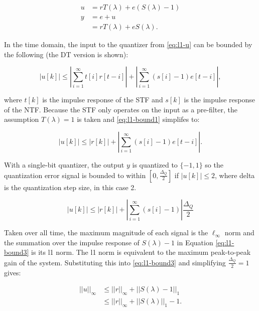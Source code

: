\begin{align}
	u &= rT(\lambda) + e\left(S(\lambda) - 1\right) \label{eq:l1-u} \\
	y &= e + u \nonumber \\
	&= rT(\lambda) + eS(\lambda). \nonumber
\end{align}

In the time domain, the input to the quantizer from \autoref{eq:l1-u} can be bounded by the following (the \gls{DT} version is shown):

\begin{equation}
	\left|u[k]\right| \leq \left|\sum_{i=1}^{\infty} t[i]r[t - i]\right| + \left|\sum_{i=1}^{\infty} \left(s[i] - 1\right)e[t - i]\right|, \label{eq:l1-bound1}
\end{equation}

where $t[k]$ is the impulse response of the \gls{STF} and $s[k]$ is the impulse response of the \gls{NTF}. Because the \gls{STF} only operates on the input as a pre-filter, the assumption $T(\lambda) = 1$ is taken and \autoref{eq:l1-bound1} simplifes to:

\begin{equation}
	\left|u[k]\right| \leq |r[k]| + \left|\sum_{i=1}^{\infty} \left(s[i] - 1\right)e[t - i]\right|. \label{eq:l1-bound2}
\end{equation}

With a single-bit quantizer, the output $y$ is quantized to $\{-1, 1\}$ so the quantization error signal is bounded to within $\left[0, \frac{\Delta_Q}{2}\right]$ if $\left|u[k]\right| \leq 2$, where \gls{delta} is the quantization step size, in this case 2.

\begin{equation} 
	\left|u[k]\right| \leq |r[k]| + \left|\sum_{i=1}^{\infty} \left(s[i] - 1\right)\right|\frac{\Delta_Q}{2} \label{eq:l1-bound3}
\end{equation}

Taken over all time, the maximum magnitude of each signal is the $\ell_\infty$ norm and the summation over the impulse response of $S(\lambda) - 1$ in Equation \ref{eq:l1-bound3} is its \gls{l1} norm. The \gls{l1} norm is equivalent to the maximum peak-to-peak gain of the system. Substituting this into \autoref{eq:l1-bound3} and simplifying $\frac{\Delta_Q}{2} = 1$ gives:

\begin{align*}
	||u||_\infty &\leq ||r||_\infty + ||S(\lambda) - 1||_1 \\
	&\leq ||r||_\infty + ||S(\lambda)||_1 - 1	.
\end{align*}

